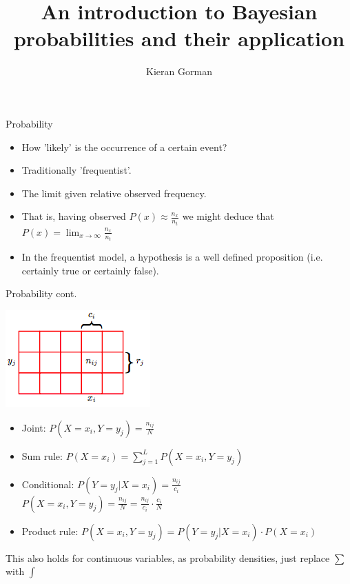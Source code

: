 \documentclass{beamer}
\title[Degrees of belief]
      {An introduction to Bayesian probabilities and their application}
\author{Kieran Gorman}
\begin{document}
\begin{frame}
  \titlepage
\end{frame}


\begin{frame}{Probability}

  \begin{itemize}
    \setlength\itemsep{1em}
    \item How 'likely' is the occurrence of a certain event?
    \item Traditionally 'frequentist'.
    \item The limit given relative observed frequency.
    \item That is, having observed $P(x) \approx \frac{n_x}{n_t}$ we
      might deduce that $P(x) = \lim_{x\to\infty} \frac{n_x}{n_t}$
    \item In the frequentist model, a hypothesis is a well defined
      proposition (i.e. certainly true or certainly false).
  \end{itemize}

\end{frame}

\begin{frame}{Probability cont.}

  \begin{center}
    \includegraphics[scale=0.5]{pgrid}
  \end{center}

  \begin{itemize}
    \item Joint: $P(X = x_i, Y = y_j) = \frac{n_{ij}}{N}$
    \item Sum rule: $P(X = x_i) = \sum_{j=1}^{L}P(X = x_i, Y = y_j)$
    \item Conditional: $P(Y = y_j | X = x_i) = \frac{n_{ij}}{c_i}$ \\
      $P(X = x_i, Y = y_j) = \frac{n_{ij}}{N} = \frac{n_{ij}}{c_i}
      \cdot \frac{c_i}{N}$
    \item Product rule: $P(X = x_i, Y = y_j) = P(Y = y_j | X = x_i) \cdot
      P(X = x_i)$
  \end{itemize}

  \begin{center}
    {\tiny
      This also holds for continuous variables, as probability
      densities, just replace $\sum$ with $\int$
    }
  \end{center}

\end{frame}
\end{document}
